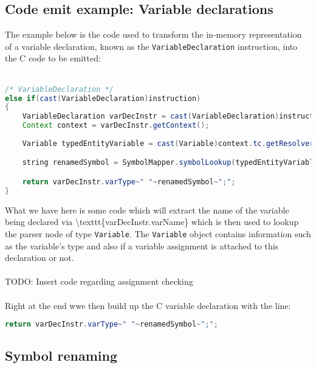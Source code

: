 \subsection{Code emit example: Variable declarations}

The example below is the code used to transform the in-memory representation
of a variable declaration, known as the \texttt{VariableDeclaration}
instruction, into the C code to be emitted:\\
\\
\begin{lstlisting}[language=Java]
/* VariableDeclaration */
else if(cast(VariableDeclaration)instruction)
{
	VariableDeclaration varDecInstr = cast(VariableDeclaration)instruction;
	Context context = varDecInstr.getContext();
	
	Variable typedEntityVariable = cast(Variable)context.tc.getResolver().resolveBest(context.getContainer(), varDecInstr.varName);

	string renamedSymbol = SymbolMapper.symbolLookup(typedEntityVariable);

	return varDecInstr.varType~" "~renamedSymbol~";";
}
\end{lstlisting}What we have here is some code which will extract the name of the
variable being declared via \textbackslash texttt\{varDecInstr.varName\}
which is then used to lookup the parser node of type \texttt{Variable}.
The \texttt{Variable} object contains information such as the variable's
type and also if a variable assignment is attached to this declaration
or not.\\
\\
TODO: Insert code regarding assignment checking\\
\\
Right at the end wwe then build up the C variable declaration with
the line:\begin{lstlisting}[language=Java]
return varDecInstr.varType~" "~renamedSymbol~";";
\end{lstlisting}

\subsection{Symbol renaming}


